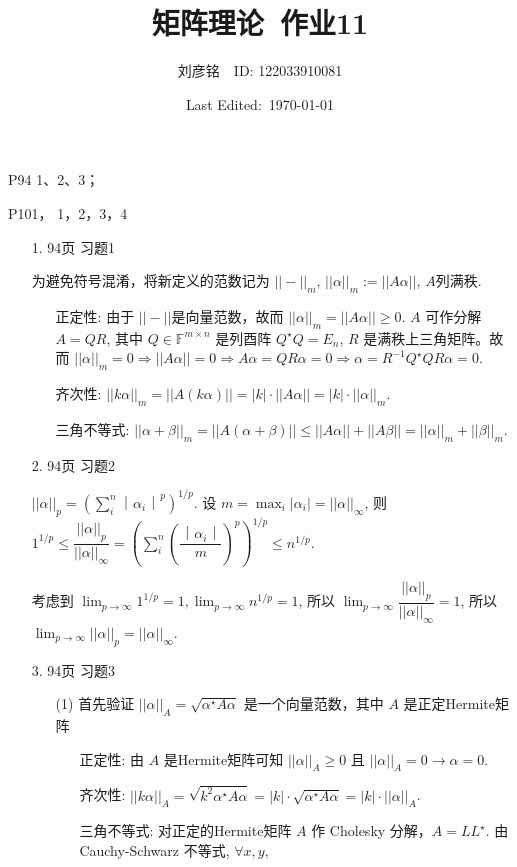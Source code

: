 \documentclass{article}
\title{矩阵理论\ 作业11}
\author{刘彦铭\ \ ID: 122033910081}
\date{Last Edited:\ \today}
\begin{document}
\maketitle

P94 1、2、3；

P101， 1，2，3，4

\begin{spacing}{1.5}
    
\begin{itemize}
    \item [1.] 94页 习题1
    
    为避免符号混淆，将新定义的范数记为 $||-||_m$, $||\alpha||_m:=||A\alpha||$, $A$列满秩.
    \begin{itemize}
        \item [正定性:] 由于 $||-||$是向量范数，故而 $||\alpha||_m = ||A\alpha|| \geq 0$. $A$ 可作分解 $A = QR$, 其中 $Q\in\mathbb{F}^{m\times n}$ 是列酉阵 $Q^\star Q=E_n$, $R$ 是满秩上三角矩阵。故而 $||\alpha||_m=0\Rightarrow ||A\alpha||=0 \Rightarrow A\alpha=QR\alpha=0 \Rightarrow \alpha = R^{-1}Q^\star QR\alpha = 0$.
        \item [齐次性:] $||k\alpha||_m = ||A(k\alpha)|| = |k|\cdot||A\alpha|| = |k|\cdot||\alpha||_m$.
        \item [三角不等式:] $||\alpha+\beta||_m = ||A(\alpha+\beta)|| \leq ||A\alpha|| + ||A\beta|| = ||\alpha||_m + ||\beta||_m$.
    \end{itemize}

    \item [2.] 94页 习题2
    
    $||\alpha||_p =\left(\sum_{i}^{n} ｜\alpha_i｜^p\right)^{1/p}$. 设 $m = \max_{i} |\alpha_i| = ||\alpha||_\infty$, 则 $1^{1/p}\leq\dfrac{||\alpha||_p}{||\alpha||_\infty} = \left(\sum_{i}^{n} \left(\dfrac{｜\alpha_i｜}{m}\right)^p\right)^{1/p}\leq n^{1/p}$.

    考虑到 $\lim_{p\to\infty} 1^{1/p} = 1, \lim_{p\to\infty} n^{1/p} = 1$, 所以 $\lim_{p\to\infty} \dfrac{||\alpha||_p}{||\alpha||_\infty} = 1$, 所以 $\lim_{p\to\infty} ||\alpha||_p = ||\alpha||_{\infty}$.

    \item [3.] 94页 习题3
    
    \begin{itemize}
        \item [(1)] 首先验证 $||\alpha||_A = \sqrt{\alpha^\star A\alpha}$ 是一个向量范数，其中 $A$ 是正定Hermite矩阵
        \begin{itemize}
            \item [正定性:] 由 $A$ 是Hermite矩阵可知 $||\alpha||_A\geq 0$ 且 $||\alpha||_A = 0 \rightarrow \alpha = 0$.
            \item [齐次性:] $||k\alpha||_A = \sqrt{k^2\alpha^\star A\alpha} = |k|\cdot\sqrt{\alpha^\star A\alpha} = |k|\cdot||\alpha||_A$.
            \item [三角不等式:] 对正定的Hermite矩阵 $A$ 作 Cholesky 分解，$A = LL^\star$. 由 Cauchy-Schwarz 不等式, $\forall x, y$,
            

\end{itemize}
\end{itemize}
\end{itemize}
\end{spacing}
\end{document}
